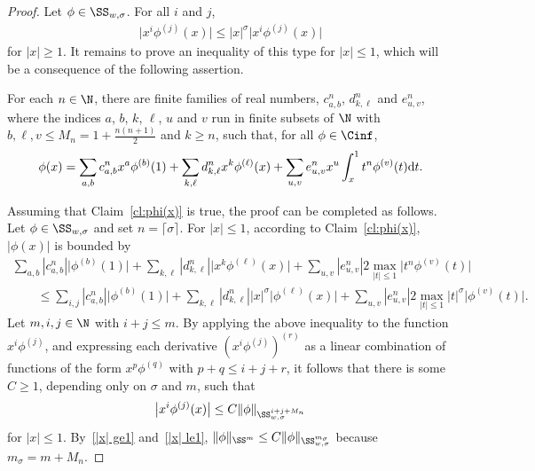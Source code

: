 \begin{proof}
  Let $\phi\in\SS_{w,\sigma}$. For all $i$ and $j$,
    \begin{gather}\label{|x| ge1}
      \big|x^i\phi^{(j)}(x)\big|\le |x|^\sigma\big|x^i\phi^{(j)}(x)\big|
    \end{gather}
  for $|x|\ge1$. It remains to prove an inequality of this type for $|x|\le1$, which will be a consequence of the following assertion.

  \begin{claim}\label{cl:phi(x)}
      For each $n\in\N$, there are f\/inite families of real numbers, $c^n_{a,b}$, $d^n_{k,\ell}$ and $e^n_{u,v}$, where the indices $a$, $b$, $k$, $\ell$, $u$ and $v$ run in f\/inite subsets of $\N$ with $b,\ell,v\le M_n=1+\frac{n(n+1)}{2}$ and $k\ge n$, such that, for all $\phi\in\Cinf$,
        \[
          \phi(x)=\sum_{a,b}c^n_{a,b}x^a\phi^{(b)}(1)+\sum_{k,\ell}d^n_{k,\ell}x^k\phi^{(\ell)}(x)
          +\sum_{u,v}e^n_{u,v}x^u\int_x^1t^n\phi^{(v)}(t){\rm d} t .
        \]
    \end{claim}

  Assuming that Claim~\ref{cl:phi(x)} is true, the proof can be completed as follows. Let $\phi\in\SS_{w,\sigma}$ and set $n=\lceil\sigma\rceil$. For $|x|\le1$, according to Claim~\ref{cl:phi(x)}, $|\phi(x)|$ is bounded by
    \begin{gather*}
      \sum_{a,b}|c^n_{a,b}|\big|\phi^{(b)}(1)\big|+\sum_{k,\ell}|d^n_{k,\ell}|\big|x^k\phi^{(\ell)}(x)\big|
       +\sum_{u,v}|e^n_{u,v}| 2\max_{|t|\le1}\big|t^n\phi^{(v)}(t)\big|\\
     \qquad{}  \le\sum_{i,j}|c^n_{a,b}|\big|\phi^{(b)}(1)\big|+\sum_{k,\ell}|d^n_{k,\ell}| |x|^\sigma\big|\phi^{(\ell)}(x)\big|
       +\sum_{u,v}|e^n_{u,v}| 2\max_{|t|\le1}|t|^\sigma\big|\phi^{(v)}(t)\big| .
    \end{gather*}
  Let $m,i,j\in\N$ with $i+j\le m$. By applying the above inequality to the function $x^i\phi^{(j)}$, and expressing each derivative $(x^i\phi^{(j)})^{(r)}$ as a linear combination of functions of the form $x^p\phi^{(q)}$ with $p+q\le i+j+r$, it follows that there is some $C\ge1$, depending only on $\sigma$ and $m$, such that
    \begin{gather}\label{|x| le1}
      \big|x^i\phi^{(j)}(x)\big|\le C \|\phi\|_{\SS_{w,\sigma}^{i+j+M_n}}
    \end{gather}
  for $|x|\le1$. By~\eqref{|x| ge1} and~\eqref{|x| le1}, $\|\phi\|_{\SS^m}\le C \|\phi\|_{\SS_{w,\sigma}^{m_\sigma}}$ because $m_\sigma=m+M_n$.


\end{proof}

